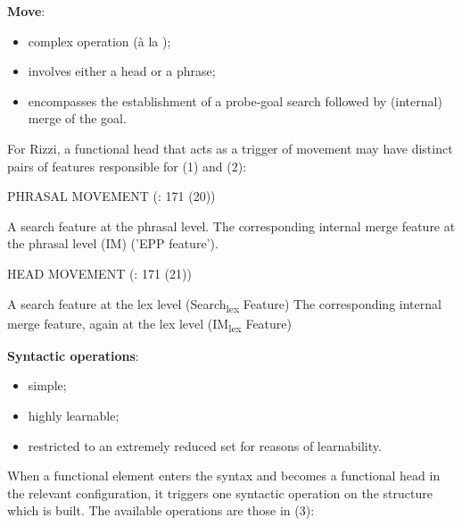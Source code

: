 \documentclass[fleqn,10pt]{wlscirep}
\begin{document}
\noindent\textbf{Move}: 
\begin{itemize}
    \item[\ding{227}] \vspace*{-2mm} complex operation (à la \citealt{chomsky2001});
    \item[\ding{227}] \vspace*{-2mm} involves either a head or a phrase;
    \item[\ding{227}] \vspace*{-2mm} encompasses the establishment of a probe-goal search followed by (internal) merge of the goal. 
\end{itemize}

For Rizzi, a functional head that acts as a trigger of movement may have distinct pairs of features responsible for (1) and (2):

\begin{exe}
    \ex PHRASAL MOVEMENT (\citealt{rizzi2017}: 171 (20))
        \begin{xlist}
            \ex A search feature at the phrasal level.
            \ex The corresponding internal merge feature at the phrasal level (IM) ('EPP feature').
        \end{xlist}
\end{exe}

\begin{exe}
    \ex HEAD MOVEMENT (\citealt{rizzi2017}: 171 (21)) 
        \begin{xlist}
            \ex A search feature at the lex level (Search\textsubscript{lex} Feature)
            \ex The corresponding internal merge feature, again at the lex level (IM\textsubscript{lex} Feature)
        \end{xlist}
\end{exe}

\noindent\textbf{Syntactic operations}: 
\begin{itemize}
    \item[\ding{227}] \vspace*{-2mm} simple;
    \item[\ding{227}] \vspace*{-2mm} highly learnable;
    \item[\ding{227}] \vspace*{-2mm} restricted to an extremely reduced set for reasons of learnability.
\end{itemize}	

\noindent When a functional element enters the syntax and becomes a functional head in the relevant configuration, it triggers one syntactic operation on the structure which is built. The available operations are those in (3):
\end{document}
